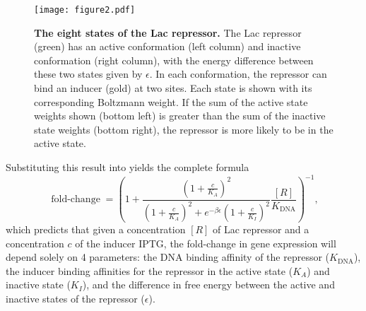 \documentclass[10pt,letterpaper]{article}
\newcommand \foldchange{\operatorname{fold-change}}
\newcommand\globalScalePlots{1}
\newcommand{\K}{K_{\text{DNA}}}
\begin{document}
\begin{figure}[h]
	\centering \texttt{[image: figure2.pdf]}
	\caption{{\bf The eight states of the Lac repressor.} The Lac repressor (green)
		has an active conformation (left column) and inactive conformation (right
		column), with the energy difference between these two states given by
		$\epsilon$. In each conformation, the repressor can bind an inducer (gold) at
		two sites. Each state is shown with its corresponding Boltzmann weight. If the
		sum of the active state weights shown (bottom left) is greater than the sum of
		the inactive state weights (bottom right), the repressor is more likely to be
		in the active state.} \label{figrepressorInducerStates}
\end{figure}

Substituting this result into \eref[eq5] yields the complete formula
\begin{equation}\label{eq7}
\foldchange= \left(
1+\frac{\left(1+\frac{c}{K_A}\right)^2}{\left(1+\frac{c}{K_A}\right)^2+e^{-\beta
		\epsilon }\left(1+\frac{c}{K_I}\right)^2}\frac{[R]}{\K} \right)^{-1},
\end{equation}
which predicts that given a concentration \([R]\) of Lac repressor and a
concentration \(c\) of the inducer IPTG, the fold-change in gene expression will
depend solely on 4 parameters: the DNA binding affinity of the repressor
(\(\K\)), the inducer binding affinities for the repressor in the active state
(\(K_A\)) and inactive state (\(K_I\)), and the difference in free energy
between the active and inactive states of the repressor (\(\epsilon\)).

\nolinenumbers



\end{document}

